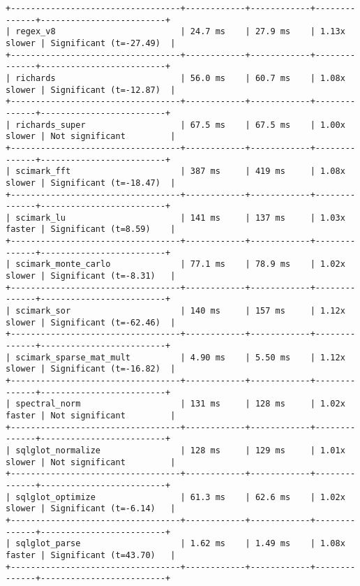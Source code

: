 \begin{code}
\begin{verbatim}
+----------------------------------+------------+------------+--------------+-------------------------+
| regex_v8                         | 24.7 ms    | 27.9 ms    | 1.13x slower | Significant (t=-27.49)  |
+----------------------------------+------------+------------+--------------+-------------------------+
| richards                         | 56.0 ms    | 60.7 ms    | 1.08x slower | Significant (t=-12.87)  |
+----------------------------------+------------+------------+--------------+-------------------------+
| richards_super                   | 67.5 ms    | 67.5 ms    | 1.00x slower | Not significant         |
+----------------------------------+------------+------------+--------------+-------------------------+
| scimark_fft                      | 387 ms     | 419 ms     | 1.08x slower | Significant (t=-18.47)  |
+----------------------------------+------------+------------+--------------+-------------------------+
| scimark_lu                       | 141 ms     | 137 ms     | 1.03x faster | Significant (t=8.59)    |
+----------------------------------+------------+------------+--------------+-------------------------+
| scimark_monte_carlo              | 77.1 ms    | 78.9 ms    | 1.02x slower | Significant (t=-8.31)   |
+----------------------------------+------------+------------+--------------+-------------------------+
| scimark_sor                      | 140 ms     | 157 ms     | 1.12x slower | Significant (t=-62.46)  |
+----------------------------------+------------+------------+--------------+-------------------------+
| scimark_sparse_mat_mult          | 4.90 ms    | 5.50 ms    | 1.12x slower | Significant (t=-16.82)  |
+----------------------------------+------------+------------+--------------+-------------------------+
| spectral_norm                    | 131 ms     | 128 ms     | 1.02x faster | Not significant         |
+----------------------------------+------------+------------+--------------+-------------------------+
| sqlglot_normalize                | 128 ms     | 129 ms     | 1.01x slower | Not significant         |
+----------------------------------+------------+------------+--------------+-------------------------+
| sqlglot_optimize                 | 61.3 ms    | 62.6 ms    | 1.02x slower | Significant (t=-6.14)   |
+----------------------------------+------------+------------+--------------+-------------------------+
| sqlglot_parse                    | 1.62 ms    | 1.49 ms    | 1.08x faster | Significant (t=43.70)   |
+----------------------------------+------------+------------+--------------+-------------------------+

\end{verbatim}
\end{code}
